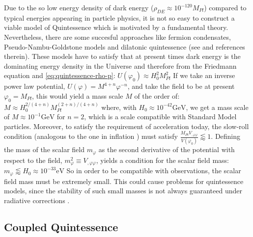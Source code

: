 Due to the so low energy density of dark energy ($\rho_{DE} \approx 10 ^{-120} M_{Pl}$)
compared to typical energies appearing in particle physics, it is not so easy to construct a 
viable model of Quintessence which is motivated by a fundamental theory. Nevertheless, there are 
some succesful approaches like fermion condensates, Pseudo-Nambu-Goldstone models and 
dilatonic quintessence (see \cite{amendola_dark_2010} and references therein).
These models have to satisfy that at present times dark energy is the dominating 
energy density in the Universe and therefore from the Friedmann equation and \cref{eq:quintessence-rho-p}:
\beeqp$
U(\varphi_0) \approx H_0^2 M_{Pl}^2
$
If we take an inverse power law potential, $U(\varphi) = M^{4+n} \varphi^{-n}$, and take the field to be at present $\varphi_0 = M_{Pl}$,
this would yield a mass scale $M$ of the order
of:
\beeqc$
M \approx H_0^{2/(4+n)} M_{Pl}^{(2+n)/(4+n)}
$
where, with $H_0 \approx 10^{-42} \mathrm{GeV} $, we get a mass scale of $M \approx 10^{-1} \mathrm{GeV}$
for $n=2$, which is a scale compatible with Standard Model particles.
Moreover, to satisfy the requirement of acceleration today, 
the slow-roll condition (analogous to the one in inflation \cite{bartolo_non-gaussianity_2004}) must satisfy 
$ \frac{M_{Pl} V_{,\varphi \varphi}}{V(\varphi_0)} \lessapprox 1$.
Defining the mass of the scalar field $m_\varphi$ as the second derivative of the potential with respect to the field,
$m^2_\varphi \equiv  V_{,\varphi \varphi} $, yields a condition for the scalar field mass:
\beeqp$
m_\varphi \lessapprox H_0 \approx 10^{-33} \mathrm{eV}
$
So in order to be compatible with observations, 
the scalar field mass must be extremely small.
This could cause problems for quintessence models,
since the stability of such small masses is not always guaranteed under radiative corrections \cite{kolda1999quintessential}.

\subsection{Coupled Quintessence \label{sub:CQ}}

